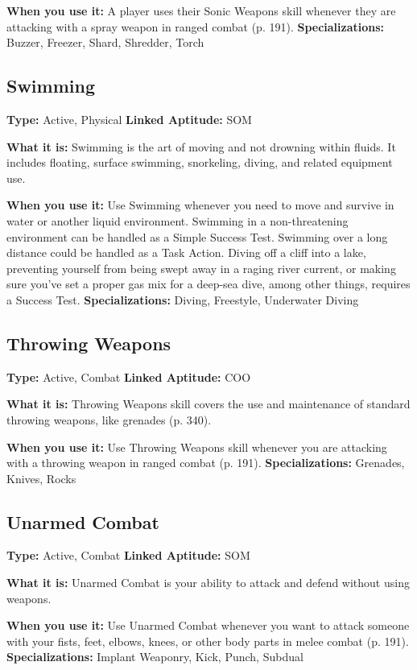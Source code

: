 \textbf{When you use it:} A player uses their Sonic Weapons 
skill whenever they are attacking with a spray weapon 
in ranged combat (p. 191).
\textbf{Specializations:} Buzzer, Freezer, Shard, Shredder, Torch

\subsection{Swimming}

\textbf{Type:} Active, Physical
\textbf{Linked Aptitude:} SOM

\textbf{What it is:} Swimming is the art of moving and 
not drowning within fluids. It includes floating, 
surface swimming, snorkeling, diving, and related 
equipment use.

\textbf{When you use it:} Use Swimming whenever you 
need to move and survive in water or another liquid 
environment. Swimming in a non-threatening environment
can be handled as a Simple Success Test.
Swimming over a long distance could be handled as 
a Task Action. Diving off a cliff into a lake, preventing
yourself from being swept away in a raging river
current, or making sure you've set a proper gas mix 
for a deep-sea dive, among other things, requires a 
Success Test.
\textbf{Specializations:} Diving, Freestyle, Underwater Diving

\subsection{Throwing Weapons}

\textbf{Type:} Active, Combat
\textbf{Linked Aptitude:} COO

\textbf{What it is:} Throwing Weapons skill covers the use 
and maintenance of standard throwing weapons, like 
grenades (p. 340).

\textbf{When you use it:} Use Throwing Weapons skill 
whenever you are attacking with a throwing weapon 
in ranged combat (p. 191).
\textbf{Specializations:} Grenades, Knives, Rocks

\subsection{Unarmed Combat}

\textbf{Type:} Active, Combat
\textbf{Linked Aptitude:} SOM

\textbf{What it is:} Unarmed Combat is your ability to attack and 
defend without using weapons.

\textbf{When you use it:} Use Unarmed Combat whenever you 
want to attack someone with your fists, feet, elbows, knees, 
or other body parts in melee combat (p. 191).
\textbf{Specializations:} Implant Weaponry, Kick, Punch, Subdual

